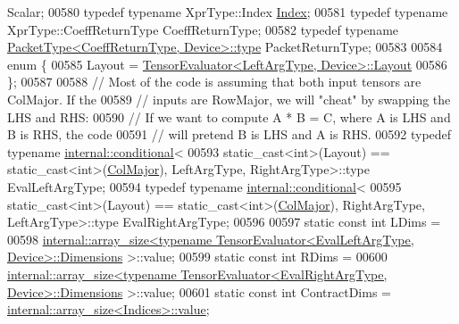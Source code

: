 \begin{DoxyCode}
       Scalar;
00580   \textcolor{keyword}{typedef} \textcolor{keyword}{typename} XprType::Index \hyperlink{namespace_eigen_a62e77e0933482dafde8fe197d9a2cfde}{Index};
00581   \textcolor{keyword}{typedef} \textcolor{keyword}{typename} XprType::CoeffReturnType CoeffReturnType;
00582   \textcolor{keyword}{typedef} \textcolor{keyword}{typename} \hyperlink{group___sparse_core___module}{PacketType<CoeffReturnType, Device>::type} 
      PacketReturnType;
00583 
00584   \textcolor{keyword}{enum} \{
00585     Layout = \hyperlink{struct_eigen_1_1_tensor_evaluator}{TensorEvaluator<LeftArgType, Device>::Layout}
00586   \};
00587 
00588   \textcolor{comment}{// Most of the code is assuming that both input tensors are ColMajor. If the}
00589   \textcolor{comment}{// inputs are RowMajor, we will "cheat" by swapping the LHS and RHS:}
00590   \textcolor{comment}{// If we want to compute A * B = C, where A is LHS and B is RHS, the code}
00591   \textcolor{comment}{// will pretend B is LHS and A is RHS.}
00592   \textcolor{keyword}{typedef} \textcolor{keyword}{typename} \hyperlink{struct_eigen_1_1internal_1_1conditional}{internal::conditional}<
00593     \textcolor{keyword}{static\_cast<}\textcolor{keywordtype}{int}\textcolor{keyword}{>}(Layout) == static\_cast<int>(\hyperlink{group__enums_ggaacded1a18ae58b0f554751f6cdf9eb13a0cbd4bdd0abcfc0224c5fcb5e4f6669a}{ColMajor}), LeftArgType, RightArgType>::type 
      EvalLeftArgType;
00594   \textcolor{keyword}{typedef} \textcolor{keyword}{typename} \hyperlink{struct_eigen_1_1internal_1_1conditional}{internal::conditional}<
00595     \textcolor{keyword}{static\_cast<}\textcolor{keywordtype}{int}\textcolor{keyword}{>}(Layout) == static\_cast<int>(\hyperlink{group__enums_ggaacded1a18ae58b0f554751f6cdf9eb13a0cbd4bdd0abcfc0224c5fcb5e4f6669a}{ColMajor}), RightArgType, LeftArgType>::type 
      EvalRightArgType;
00596 
00597   \textcolor{keyword}{static} \textcolor{keyword}{const} \textcolor{keywordtype}{int} LDims =
00598       
      \hyperlink{struct_eigen_1_1internal_1_1array__size}{internal::array\_size<typename TensorEvaluator<EvalLeftArgType, Device>::Dimensions}
      >::value;
00599   \textcolor{keyword}{static} \textcolor{keyword}{const} \textcolor{keywordtype}{int} RDims =
00600       
      \hyperlink{struct_eigen_1_1internal_1_1array__size}{internal::array\_size<typename TensorEvaluator<EvalRightArgType, Device>::Dimensions}
      >::value;
00601   \textcolor{keyword}{static} \textcolor{keyword}{const} \textcolor{keywordtype}{int} ContractDims = \hyperlink{struct_eigen_1_1internal_1_1array__size}{internal::array\_size<Indices>::value};

\end{DoxyCode}
